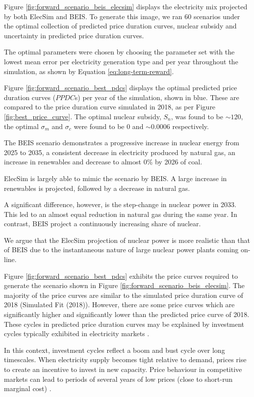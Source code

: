 Figure \ref{fig:forward_scenario_beis_elecsim} displays the electricity mix projected by both ElecSim and BEIS. To generate this image, we ran 60 scenarios under the optimal collection of predicted price duration curves, nuclear subsidy and uncertainty in predicted price duration curves. 

The optimal parameters were chosen by choosing the parameter set with the lowest mean error per electricity generation type and per year throughout the simulation, as shown by Equation \ref{eq:long-term-reward}.


Figure \ref{fig:forward_scenario_best_pdcs} displays the optimal predicted price duration curves ($PPDC$s) per year of the simulation, shown in blue. These are compared to the price duration curve simulated in 2018, as per Figure \ref{fig:best_price_curve}. The optimal nuclear subsidy, $S_n$, was found to be ${\sim}$\textsterling $120$, the optimal $\sigma_m$ and $\sigma_c$ were found to be $0$ and ${\sim}0.0006$ respectively.

The BEIS scenario demonstrates a progressive increase in nuclear energy from 2025 to 2035, a consistent decrease in electricity produced by natural gas, an increase in renewables and decrease to almost 0\% by 2026 of coal.

ElecSim is largely able to mimic the scenario by BEIS. A large increase in renewables is projected, followed by a decrease in natural gas. 

A significant difference, however, is the step-change in nuclear power in 2033. This led to an almost equal reduction in natural gas during the same year. In contrast, BEIS project a continuously increasing share of nuclear. 

We argue that the ElecSim projection of nuclear power is more realistic than that of BEIS due to the instantaneous nature of large nuclear power plants coming on-line.

Figure \ref{fig:forward_scenario_best_pdcs} exhibits the price curves required to generate the scenario shown in Figure \ref{fig:forward_scenario_beis_elecsim}. The majority of the price curves are similar to the simulated price duration curve of 2018 (Simulated Fit (2018)). However, there are some price curves which are significantly higher and significantly lower than the predicted price curve of 2018. These cycles in predicted price duration curves may be explained by investment cycles typically exhibited in electricity markets \cite{Gross2007}. 

In this context, investment cycles reflect a boom and bust cycle over long timescales. When electricity supply becomes tight relative to demand, prices rise to create an incentive to invest in new capacity. Price behaviour in competitive markets can lead to periods of several years of low prices (close to short-run marginal cost) \cite{white2005concentrated}. 

